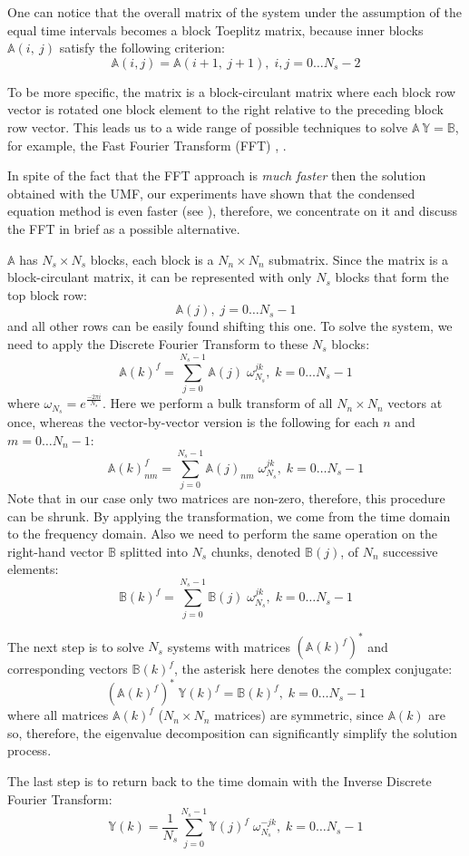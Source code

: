 One can notice that the overall matrix of the system under the assumption of the equal time intervals becomes a block Toeplitz matrix, because inner blocks $\mathbb{A}(i, \: j)$ satisfy the following criterion:
\[
  \mathbb{A}(i, j) = \mathbb{A}(i+1, \: j+1), \; i, j = 0 \dots N_s - 2
\]

To be more specific, the matrix is a block-circulant matrix where each block row vector is rotated one block element to the right relative to the preceding block row vector. This leads us to a wide range of possible techniques to solve \mbox{$\mathbb{A} \: \mathbb{Y} = \mathbb{B}$}, for example, the Fast Fourier Transform (FFT) \cite{mazancourt1983}, \cite{vescovo1997}.

In spite of the fact that the FFT approach is \emph{much faster} then the solution obtained with the UMF, our experiments have shown that the condensed equation method is even faster (see ), therefore, we concentrate on it and discuss the FFT in brief as a possible alternative.

$\mathbb{A}$ has $N_s \times N_s$ blocks, each block is a $N_n \times N_n$ submatrix. Since the matrix is a block-circulant matrix, it can be represented with only $N_s$ blocks that form the top block row:
\[
  \mathbb{A}(j), \; j = 0 \dots N_s - 1
\]
and all other rows can be easily found shifting this one. To solve the system, we need to apply the Discrete Fourier Transform to these $N_s$ blocks:
\[
  \mathbb{A}(k)^f = \sum_{j = 0}^{N_s - 1} \mathbb{A}(j) \; \omega_{N_s}^{jk}, \; k = 0 \dots N_s - 1
\]
where $\omega_{N_s} = e^{\frac{-2 \pi i}{N_s}}$. Here we perform a bulk transform of all $N_n \times N_n$ vectors at once, whereas the vector-by-vector version is the following for each $n$ and $m = 0 \dots N_n - 1$:
\[
  \mathbb{A}(k)^f_{nm} = \sum_{j = 0}^{N_s - 1} \mathbb{A}(j)_{nm} \; \omega_{N_s}^{jk}, \; k = 0 \dots N_s - 1
\]
Note that in our case only two matrices are non-zero, therefore, this procedure can be shrunk. By applying the transformation, we come from the time domain to the frequency domain. Also we need to perform the same operation on the right-hand vector $\mathbb{B}$ splitted into $N_s$ chunks, denoted $\mathbb{B}(j)$, of $N_n$ successive elements:
\[
  \mathbb{B}(k)^f = \sum_{j = 0}^{N_s - 1} \mathbb{B}(j) \; \omega_{N_s}^{jk}, \; k = 0 \dots N_s - 1
\]

The next step is to solve $N_s$ systems with matrices $(\mathbb{A}(k)^f)^{\ast}$ and corresponding vectors $\mathbb{B}(k)^f$, the asterisk here denotes the complex conjugate:
\[
  (\mathbb{A}(k)^f)^{\ast} \; \mathbb{Y}(k)^f = \mathbb{B}(k)^f, \; k = 0 \dots N_s - 1
\]
where all matrices $\mathbb{A}(k)^f$ ($N_n \times N_n$ matrices) are symmetric, since $\mathbb{A}(k)$ are so, therefore, the eigenvalue decomposition can significantly simplify the solution process.

The last step is to return back to the time domain with the Inverse Discrete Fourier Transform:
\[
  \mathbb{Y}(k) = \frac{1}{N_s} \sum_{j = 0}^{N_s - 1} \mathbb{Y}(j)^f \; \omega_{N_s}^{-jk}, \; k = 0 \dots N_s - 1
\]
